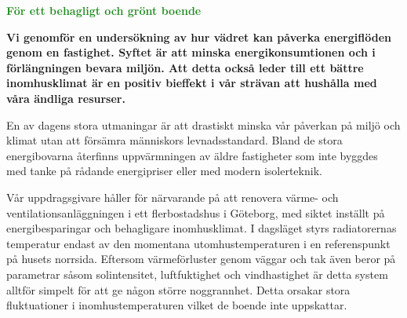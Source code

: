 \documentclass[11pt,a4paper]{article}
\begin{document}
\addtolength{\parindent}{-0.6 cm}
\pagestyle{fancy}
\rhead{\sc\footnotesize \today}
\mbox{}
\vspace{4mm}

\begin{center}
\textcolor{ForestGreen}{\textbf{\Huge För ett behagligt och grönt boende}}
\end{center}

\mbox{}
\vspace{4mm}

\setlength{\columnsep}{5mm}
\begin{multicols}{2}
\addtolength{\parskip}{1.5ex}
\linespread{1.1}
\normalsize

\textbf{Vi genomför en undersökning av hur vädret kan påverka energiflöden genom en fastighet. Syftet är att minska energikonsumtionen och i förlängningen bevara miljön. Att detta också leder till ett bättre inomhusklimat är en positiv bieffekt i vår strävan att hushålla med våra ändliga resurser.}

\begin{comment}
\textbf{I dagens samhälle blir kontrollen över vår energikonsumtion allt viktigare, en naturlig följd av både miljömedvetenhet och skenande elpriser. En stor del av våra bostäders energianvändning går åt till uppvärmning, vilket föranleder frågeställningen: kan man minska denna förbrukning genom att ta hänsyn till hela spektrumet av väderparametrar?}
\end{comment}

En av dagens stora utmaningar är att drastiskt minska vår påverkan på miljö och klimat utan att försämra människors levnadsstandard. Bland de stora energibovarna återfinns uppvärmningen av äldre fastigheter som inte byggdes med tanke på rådande energipriser eller med modern isolerteknik.

Vår uppdragsgivare håller för närvarande på att renovera värme- och ventilationsanläggningen i ett flerbostadshus i Göteborg, med siktet inställt på energibesparingar och behagligare inomhusklimat. I dagsläget styrs radiatorernas  temperatur endast av den momentana utomhustemperaturen i en referenspunkt på husets norrsida. Eftersom värmeförluster genom väggar och tak även beror på parametrar såsom solintensitet, luftfuktighet och vindhastighet är detta system alltför simpelt för att ge någon större noggrannhet. Detta orsakar stora fluktuationer i inomhustemperaturen vilket de boende inte uppskattar.


\end{multicols}
\end{document}
